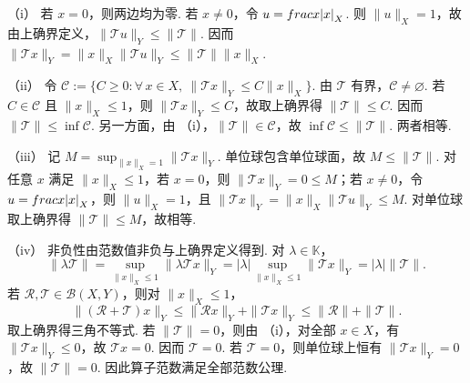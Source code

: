 \begin{FAProof}
（i） 若 \(\displaystyle x=0\)，则两边均为零. 若 \(\displaystyle x\neq0\)，令 \(\displaystyle u=\\frac{x}{\\|x\\|}_X\). 则 \(\displaystyle \|u\|_X=1\)，故由上确界定义，\(\displaystyle \|\mathcal T u\|_Y\leqslant\|\mathcal T\|\). 因而 \(\displaystyle \|\mathcal T x\|_Y =\|x\|_X\|\mathcal T u\|_Y \leqslant\|\mathcal T\|\|x\|_X\).

（ii） 令 \(\displaystyle \mathcal C :=\{C\geqslant0:\forall\,x\in X,\ \|\mathcal T x\|_Y\leqslant C\|x\|_X\}\).
由 \(\displaystyle \mathcal T\) 有界，\(\displaystyle \mathcal C\neq\varnothing\). 若 \(\displaystyle C\in\mathcal C\) 且 \(\displaystyle \|x\|_X\leqslant1\)，则 \(\displaystyle \|\mathcal T x\|_Y\leqslant C\)，故取上确界得 \(\displaystyle \|\mathcal T\|\leqslant C\). 因而 \(\displaystyle \|\mathcal T\|\leqslant\inf\mathcal C\). 另一方面，由 （i），\(\displaystyle \|\mathcal T\|\in\mathcal C\)，故 \(\displaystyle \inf\mathcal C\leqslant\|\mathcal T\|\). 两者相等.

（iii） 记 \(\displaystyle M=\sup_{\|x\|_X=1}\|\mathcal T x\|_Y\). 单位球包含单位球面，故 \(\displaystyle M\leqslant\|\mathcal T\|\). 对任意 \(\displaystyle x\) 满足 \(\displaystyle \|x\|_X\leqslant1\)，若 \(\displaystyle x=0\)，则 \(\displaystyle \|\mathcal T x\|_Y=0\leqslant M\)；若 \(\displaystyle x\neq0\)，令 \(\displaystyle u=\\frac{x}{\\|x\\|}_X\)，则 \(\displaystyle \|u\|_X=1\)，且 \(\displaystyle \|\mathcal T x\|_Y =\|x\|_X\|\mathcal T u\|_Y \leqslant M\).
对单位球取上确界得 \(\displaystyle \|\mathcal T\|\leqslant M\)，故相等.

（iv） 非负性由范数值非负与上确界定义得到. 对 \(\displaystyle \lambda\in\mathbb K\)，
\[
\|\lambda\mathcal T\|
=\sup_{\|x\|_X\leqslant1}\|\lambda\mathcal T x\|_Y
=|\lambda|\sup_{\|x\|_X\leqslant1}\|\mathcal T x\|_Y
=|\lambda|\|\mathcal T\|.
\]
若 \(\displaystyle \mathcal R,\mathcal T\in\mathcal B(X,Y)\)，则对 \(\displaystyle \|x\|_X\leqslant1\)，
\[
\|(\mathcal R+\mathcal T)x\|_Y
\leqslant\|\mathcal R x\|_Y+\|\mathcal T x\|_Y
\leqslant\|\mathcal R\|+\|\mathcal T\|.
\]
取上确界得三角不等式. 若 \(\displaystyle \|\mathcal T\|=0\)，则由 （i），对全部 \(\displaystyle x\in X\)，有 \(\displaystyle \|\mathcal T x\|_Y\leqslant0\)，故 \(\displaystyle \mathcal T x=0\). 因而 \(\displaystyle \mathcal T=0\). 若 \(\displaystyle \mathcal T=0\)，则单位球上恒有 \(\displaystyle \|\mathcal T x\|_Y=0\)，故 \(\displaystyle \|\mathcal T\|=0\). 因此算子范数满足全部范数公理.


\end{FAProof}
